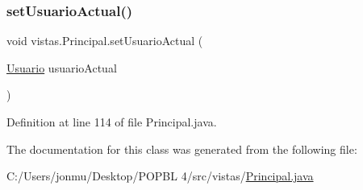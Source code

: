 \subsubsection{\texorpdfstring{set\+Usuario\+Actual()}{setUsuarioActual()}}
{\footnotesize\ttfamily void vistas.\+Principal.\+set\+Usuario\+Actual (\begin{DoxyParamCaption}\item[{\mbox{\hyperlink{classobjetos_1_1_usuario}{Usuario}}}]{usuario\+Actual }\end{DoxyParamCaption})}



Definition at line 114 of file Principal.\+java.



The documentation for this class was generated from the following file\+:\begin{DoxyCompactItemize}
\item 
C\+:/\+Users/jonmu/\+Desktop/\+P\+O\+P\+B\+L 4/src/vistas/\mbox{\hyperlink{_principal_8java}{Principal.\+java}}\end{DoxyCompactItemize}
